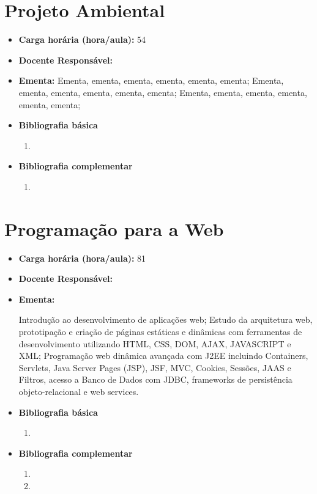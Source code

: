 \documentclass[11pt,fleqn]{book} %
\begin{document}

\newpage
\section{Projeto Ambiental}\label{disc:projamb}

\begin{itemize}
	\item \textbf{Carga horária (hora/aula):} 54
	\item \textbf{Docente Responsável:}~
	\item \textbf{Ementa:} 
	Ementa, ementa, ementa, ementa, ementa, ementa;
	Ementa, ementa, ementa, ementa, ementa, ementa;
	Ementa, ementa, ementa, ementa, ementa, ementa;
	\item \textbf{Bibliografia básica}
	\begin{enumerate}
		\item 
	\end{enumerate}
	\item \textbf{Bibliografia complementar}
	\begin{enumerate}
		\item 	
	\end{enumerate}	
\end{itemize}


\newpage
\section{Programação para a Web}\label{disc:ppw}

\begin{itemize}
	\item \textbf{Carga horária (hora/aula):} 81
	\item \textbf{Docente Responsável:}~
	\item \textbf{Ementa:} 

	Introdução ao desenvolvimento de aplicações web;
	Estudo da arquitetura web, prototipação e criação de páginas estáticas e dinâmicas com ferramentas de desenvolvimento utilizando HTML, CSS, DOM, AJAX, JAVASCRIPT e XML;
	Programação web dinâmica avançada com J2EE incluindo Containers, Servlets, Java Server Pages (JSP), JSF, MVC, Cookies, Sessões, JAAS e Filtros, acesso a Banco de Dados com JDBC, frameworks de persistência objeto-relacional e web services.
	
	\item \textbf{Bibliografia básica}
	\begin{enumerate}
		\item 
	\end{enumerate}
	\item \textbf{Bibliografia complementar}
	\begin{enumerate}
		\item
		\item 
	\end{enumerate}
\end{itemize}
\end{document}
